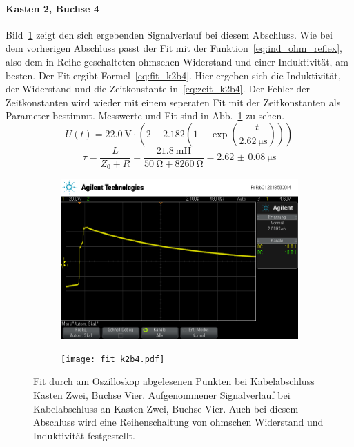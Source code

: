 \paragraph{Kasten 2, Buchse 4}
Bild~\ref{fig:k2b4} zeigt den sich ergebenden Signalverlauf bei diesem
Abschluss.  Wie bei dem vorherigen Abschluss passt der Fit mit der
Funktion~\eqref{eq:ind_ohm_reflex}, also dem in Reihe geschalteten
ohmschen Widerstand und einer Induktivität, am besten.  Der Fit ergibt
Formel~\eqref{eq:fit_k2b4}.  Hier ergeben sich die Induktivität, der 
Widerstand und die Zeitkonstante in~\eqref{eq:zeit_k2b4}.
Der Fehler der Zeitkonstanten wird wieder mit einem seperaten 
Fit mit der Zeitkonstanten als Parameter bestimmt. 
Messwerte und Fit sind in
Abb.~\ref{fig:k2b4} zu sehen.
%
\begin{equation}
  U(t) = \SI{22.0}{\volt}\cdot\left(2 - 
    2.182\left(1-\exp{\left(\frac{-t}{\SI{2.62}{\micro\second}}\right)}
    \right)\right)
  \label{eq:fit_k2b4}
\end{equation}
%
\begin{equation}
  \tau = \frac{L}{Z_0 + R} = 
\frac{\SI{21.8}{\milli\henry}}{\SI{50}{\ohm} + 
\SI{8260}{\ohm}} =\SI{2.62(8)}{\micro\second}
  \label{eq:zeit_k2b4}
\end{equation}
%
\begin{figure}[]
  \centering

  \begin{subfigure}{0.45\textwidth}
    \includegraphics[width=\textwidth]{k2b4.png}
  \end{subfigure}
  \quad
  \begin{subfigure}{0.45\textwidth}
    \texttt{[image: fit\_k2b4.pdf]}
  \end{subfigure}

  \caption{Fit durch am Oszilloskop abgelesenen Punkten bei
    Kabelabschluss Kasten Zwei, Buchse Vier.  Aufgenommener
    Signalverlauf bei Kabelabschluss an Kasten Zwei, Buchse Vier. Auch
    bei diesem Abschluss wird eine Reihenschaltung von ohmschen
    Widerstand und Induktivität festgestellt.}
  \label{fig:k2b4}
\end{figure}

